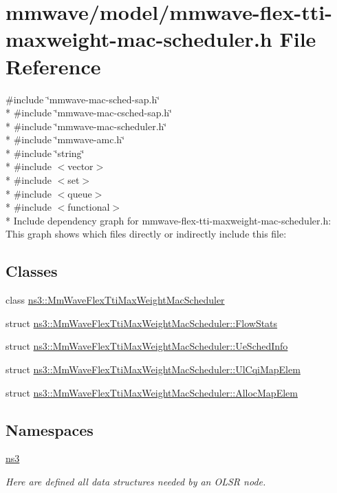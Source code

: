 \hypertarget{mmwave-flex-tti-maxweight-mac-scheduler_8h}{}\section{mmwave/model/mmwave-\/flex-\/tti-\/maxweight-\/mac-\/scheduler.h File Reference}
\label{mmwave-flex-tti-maxweight-mac-scheduler_8h}
{\ttfamily \#include \char`\"{}mmwave-\/mac-\/sched-\/sap.\+h\char`\"{}}\\*
{\ttfamily \#include \char`\"{}mmwave-\/mac-\/csched-\/sap.\+h\char`\"{}}\\*
{\ttfamily \#include \char`\"{}mmwave-\/mac-\/scheduler.\+h\char`\"{}}\\*
{\ttfamily \#include \char`\"{}mmwave-\/amc.\+h\char`\"{}}\\*
{\ttfamily \#include \char`\"{}string\char`\"{}}\\*
{\ttfamily \#include $<$vector$>$}\\*
{\ttfamily \#include $<$set$>$}\\*
{\ttfamily \#include $<$queue$>$}\\*
{\ttfamily \#include $<$functional$>$}\\*
Include dependency graph for mmwave-\/flex-\/tti-\/maxweight-\/mac-\/scheduler.h\+:
This graph shows which files directly or indirectly include this file\+:
\subsection*{Classes}
\begin{DoxyCompactItemize}
\item 
class \hyperlink{classns3_1_1MmWaveFlexTtiMaxWeightMacScheduler}{ns3\+::\+Mm\+Wave\+Flex\+Tti\+Max\+Weight\+Mac\+Scheduler}
\item 
struct \hyperlink{structns3_1_1MmWaveFlexTtiMaxWeightMacScheduler_1_1FlowStats}{ns3\+::\+Mm\+Wave\+Flex\+Tti\+Max\+Weight\+Mac\+Scheduler\+::\+Flow\+Stats}
\item 
struct \hyperlink{structns3_1_1MmWaveFlexTtiMaxWeightMacScheduler_1_1UeSchedInfo}{ns3\+::\+Mm\+Wave\+Flex\+Tti\+Max\+Weight\+Mac\+Scheduler\+::\+Ue\+Sched\+Info}
\item 
struct \hyperlink{structns3_1_1MmWaveFlexTtiMaxWeightMacScheduler_1_1UlCqiMapElem}{ns3\+::\+Mm\+Wave\+Flex\+Tti\+Max\+Weight\+Mac\+Scheduler\+::\+Ul\+Cqi\+Map\+Elem}
\item 
struct \hyperlink{structns3_1_1MmWaveFlexTtiMaxWeightMacScheduler_1_1AllocMapElem}{ns3\+::\+Mm\+Wave\+Flex\+Tti\+Max\+Weight\+Mac\+Scheduler\+::\+Alloc\+Map\+Elem}
\end{DoxyCompactItemize}
\subsection*{Namespaces}
\begin{DoxyCompactItemize}
\item 
 \hyperlink{namespacens3}{ns3}
\begin{DoxyCompactList}\small\item\em Here are defined all data structures needed by an O\+L\+SR node. \end{DoxyCompactList}\end{DoxyCompactItemize}

